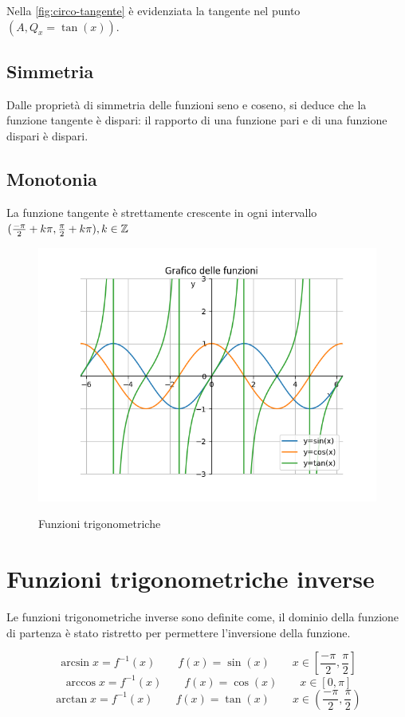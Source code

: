 Nella \autoref{fig:circo-tangente} è evidenziata la tangente nel punto $(A,Q_x=\tan(x))$.

\subsection{Simmetria}
Dalle proprietà di simmetria delle funzioni seno e coseno, si deduce che la funzione tangente è dispari: il rapporto di una funzione pari e di una funzione dispari è dispari.

\subsection{Monotonia}
La funzione tangente è strettamente crescente in ogni intervallo $(\frac{-\pi}{2}+k\pi,\frac{\pi}{2}+k\pi), k\in \mathbb{Z}$

\begin{figure}[H]
{\includegraphics[width=.9\linewidth]{gfx/4/trigonometriche.png}}
\caption{Funzioni trigonometriche}\label{fig:trigonometriche}
\end{figure}

\section{Funzioni trigonometriche inverse}
Le funzioni trigonometriche inverse sono definite come, il dominio della funzione di partenza è stato ristretto per permettere l'inversione della funzione.

\[\arcsin x = f^{-1}(x) \qquad f(x)=\sin(x) \qquad x\in [\frac{-\pi}{2}, \frac{\pi}{2}]\]
\[\arccos x = f^{-1}(x) \qquad f(x)=\cos(x) \qquad x\in [0, \pi]\]
\[\arctan x = f^{-1}(x) \qquad f(x)=\tan(x) \qquad x\in (\frac{-\pi}{2}, \frac{\pi}{2})\]

